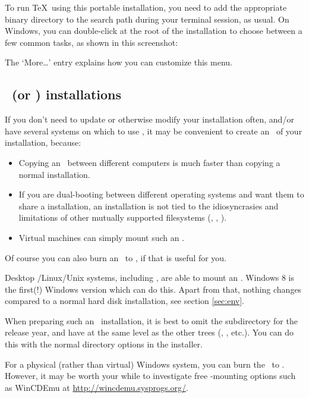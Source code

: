 \documentclass{article}
\begin{document}
To run \TeX\ using this portable installation, you need to add the
appropriate binary directory to the search path during your terminal
session, as usual.  On Windows, you can double-click
 at the root of the installation to choose
between a few common tasks, as shown in this screenshot:

\medskip
{}
\smallskip

\noindent The `More\ldots' entry explains how you can customize this menu.


\subsection{\ISO\ (or \DVD) installations}
\label{sec:isoinstall}

If you don't need to update or otherwise modify your installation often,
and\slash or have several systems on which to use \TL{}, it may be
convenient to create an \ISO\ of your \TL{} installation, because:

\begin{itemize}
\item Copying an \ISO\ between different computers is much
  faster than copying a normal installation.
\item If you are dual-booting between different operating systems
  and want them to share a \TL{} installation, an \ISO
  installation is not tied to the idiosyncrasies and limitations of
  other mutually supported filesystems (, ,
  ).
\item Virtual machines can simply mount such an \ISO.
\end{itemize}

Of course you can also burn an \ISO\ to \DVD, if that is useful for you.

Desktop \GNU/Linux/Unix systems, including \MacOSX, are able to
mount an \ISO. Windows 8 is the first(!) Windows version which can
do this. Apart from that, nothing changes compared to a normal hard
disk installation, see section \ref{sec:env}.

When preparing such an \ISO\ installation, it is best to omit the
subdirectory for the release year, and have
 at the same level as the other trees
(, , etc.).  You can do this with
the normal directory options in the installer.

For a physical (rather than virtual) Windows system, you can burn
the \ISO\ to . However, it may be worth your while to
investigate free \ISO-mounting options such as WinCDEmu at
\url{http://wincdemu.sysprogs.org/}.
\end{document}
